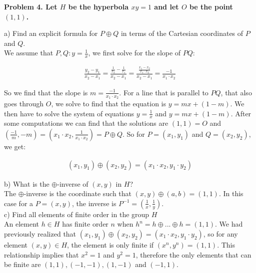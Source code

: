 \documentclass[20pt]{article}
\begin{document}
\noindent
\textbf{Problem 4. Let $H$ be the hyperbola $xy = 1$ and let $O$ be the point $(1, 1)$.}\\
\begin{text}
    \noindent
    a) Find an explicit formula for $P \oplus Q$ in terms of the Cartesian coordinates of $P$ and $Q$.\\
    
    We assume that $P,Q: y = \frac{1}{x}$, we first solve for the slope of $PQ$:
    
    \begin{align}
        \frac{y_2 - y_1}{x_2 - x_1} = \frac{\frac{1}{x_2} - \frac{1}{x_1}}{x_2 - x_1} = \frac{ \frac{x_1 - x_2}{x_1 \cdot x_2} }{ x_2 - x_1 } = \frac{-1}{x_1 \cdot x_2} \nonumber
    \end{align}
    
    So we find that the slope is $m = \frac{-1}{x_1 \cdot x_2}$. For a line that is parallel to $PQ$, that also goes through $O$, we solve to find that the equation is $y = mx + (1 - m)$. We then have to solve the system of equations $y = \frac{1}{x}$ and $y = mx + (1 - m)$. After some computations we can find that the solutions are $(1, 1) = O$ and $(\frac{-1}{m}, -m) = (x_1 \cdot x_2, \frac{1}{x_1 \cdot x_2}) = P \oplus Q$. So for $P = (x_1, y_1)$ and $Q = (x_2, y_2)$, we get:
    
    \begin{align}
        (x_1, y_1) \oplus (x_2, y_2) = (x_1 \cdot x_2, y_1 \cdot y_2)\nonumber
    \end{align}
    
    \noindent    
    b) What is the $\oplus$-inverse of $(x, y)$ in $H$?\\
    
    The $\oplus$-inverse is the coordinate such that $(x, y) \oplus (a, b) = (1, 1)$. In this case for a $P = (x,y)$, the inverse is $P^{-1} = (\frac{1}{x}, \frac{1}{y})$.\\
    
    \noindent
    c) Find all elements of finite order in the group $H$\\
    
    An element $h \in H$ has finite order $n$ when $h^n = h \oplus ... \oplus h = (1, 1)$. We had previously realized that $(x_1, y_1) \oplus (x_2, y_2) = (x_1 \cdot x_2, y_1 \cdot y_2)$, so for any element $(x, y) \in H$, the element is only finite if $(x^n,y^n) = (1, 1)$. This relationship implies that $x^2 = 1$ and $y^2 = 1$, therefore the only elements that can be finite are $(1, 1), (-1, -1), (1, -1)$ and $(-1, 1)$.
\end{text}\\
\end{document}
